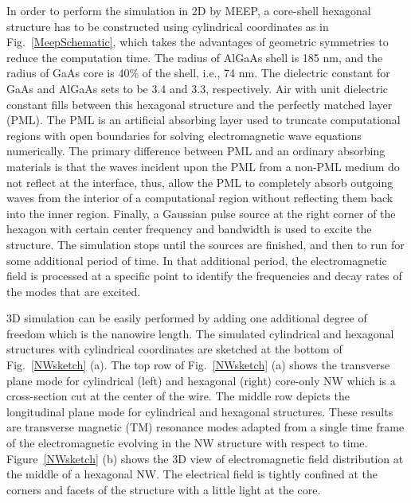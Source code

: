 In order to perform the simulation in 2D by MEEP, a core-shell hexagonal
structure has to be constructed using cylindrical coordinates as in
Fig.~\ref{MeepSchematic}, which takes the advantages of geometric symmetries to
reduce the computation time. The radius of AlGaAs shell is 185 nm, and the
radius of GaAs core is 40\% of the shell, i.e., 74 nm. The dielectric constant
for GaAs and AlGaAs sets to be 3.4 and 3.3, respectively. Air with unit
dielectric constant fills between this hexagonal structure and the perfectly
matched layer (PML). The PML is an artificial absorbing layer used to truncate
computational regions with open boundaries for solving electromagnetic wave
equations numerically. The primary difference between PML and an ordinary
absorbing materials is that the waves incident upon the PML from a non-PML
medium do not reflect at the interface, thus, allow the PML to completely
absorb outgoing waves from the interior of a computational region without
reflecting them back into the inner region. Finally, a Gaussian pulse source
at the right corner of the hexagon with certain center frequency and bandwidth
is used to excite the structure. The simulation stops until the sources are
finished, and then to run for some additional period of time. In that
additional period, the electromagnetic field is processed at a specific point
to identify the frequencies and decay rates of the modes that are excited.

3D simulation can be easily performed by adding one additional degree of
freedom which is the nanowire length. The simulated cylindrical and hexagonal
structures with cylindrical coordinates are sketched at the bottom of
Fig.~\ref{NWsketch} (a). The top row of Fig.~\ref{NWsketch} (a) shows the
transverse plane mode for cylindrical (left) and hexagonal (right) core-only NW
which is a cross-section cut at the center of the wire. The middle row depicts
the longitudinal plane mode for cylindrical and hexagonal structures. These
results are transverse magnetic (TM) resonance modes adapted from a single time
frame of the electromagnetic evolving in the NW structure with respect to time.
Figure~\ref{NWsketch} (b) shows the 3D view of electromagnetic field
distribution at the middle of a hexagonal NW. The electrical field is tightly
confined at the corners and facets of the structure with a little light at the
core.

